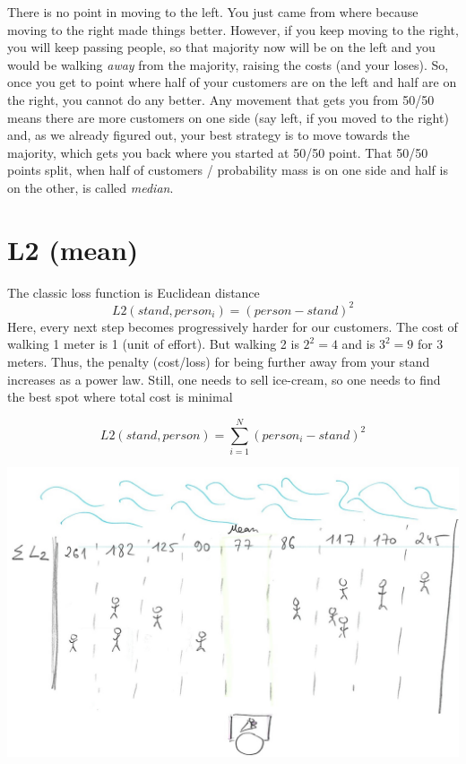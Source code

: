 \documentclass[
]{book}
\begin{document}
There is no point in moving to the left. You just came from where because moving to the right made things better. However, if you keep moving to the right, you will keep passing people, so that majority now will be on the left and you would be walking \emph{away} from the majority, raising the costs (and your loses). So, once you get to point where half of your customers are on the left and half are on the right, you cannot do any better. Any movement that gets you from 50/50 means there are more customers on one side (say left, if you moved to the right) and, as we already figured out, your best strategy is to move towards the majority, which gets you back where you started at 50/50 point. That 50/50 points split, when half of customers / probability mass is on one side and half is on the other, is called \emph{median}.

\hypertarget{l2-mean}{%
\section{L2 (mean)}\label{l2-mean}}

The classic loss function is Euclidean distance \[L2(stand, person_i) = (person - stand)^2\]
Here, every next step becomes progressively harder for our customers. The cost of walking 1 meter is 1 (unit of effort). But walking 2 is \(2^2 = 4\) and is \(3^2=9\) for 3 meters. Thus, the penalty (cost/loss) for being further away from your stand increases as a power law. Still, one needs to sell ice-cream, so one needs to find the best spot where total cost is minimal

\[L2(stand, person) = \sum_{i=1}^{N}{(person_i - stand)^2}\]

\begin{center}\includegraphics[width=1\linewidth]{images/loss-functions-L2-mean} \end{center}
\end{document}
